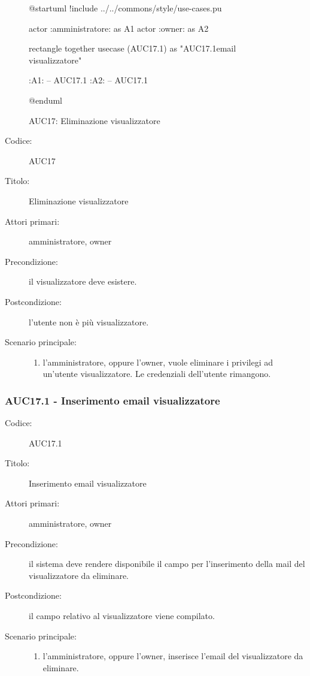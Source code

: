 \documentclass[../../../analisi-dei-requisiti.tex]{subfiles}
\begin{document}
\begin{figure}[h!]
  \centering
  \begin{plantuml}
  @startuml
  !include ../../commons/style/use-cases.pu

  actor :amministratore: as A1
  actor :owner: as A2

  rectangle {
    together {
      usecase (AUC17.1) as "AUC17.1\nInserimento email visualizzatore"
    }
  }

  :A1: -- AUC17.1
  :A2: -- AUC17.1

  @enduml
  \end{plantuml}
  \caption{AUC17: Eliminazione visualizzatore}
  \label{fig:auc17}
\end{figure}

\begin{description}
  \item[Codice:] AUC17
  \item[Titolo:] Eliminazione visualizzatore
  \item[Attori primari:] amministratore, owner
  \item[Precondizione:] il visualizzatore deve esistere.
  \item[Postcondizione:] l'utente non è più visualizzatore.
  \item[Scenario principale:]
  \begin{enumerate}
    \item l'amministratore, oppure l'owner, vuole eliminare i privilegi ad un'utente visualizzatore. Le credenziali dell'utente rimangono.
  \end{enumerate}
\end{description}

\subsubsection{AUC17.1 - Inserimento email visualizzatore}%
\label{subs:AUC17.1}
\begin{description}
  \item[Codice:] AUC17.1
  \item[Titolo:] Inserimento email visualizzatore
  \item[Attori primari:] amministratore, owner
  \item[Precondizione:] il sistema deve rendere disponibile il campo per l'inserimento della mail del visualizzatore da eliminare.
  \item[Postcondizione:] il campo relativo al visualizzatore viene compilato.
  \item[Scenario principale:]
  \begin{enumerate}
    \item l'amministratore, oppure l'owner, inserisce l'email del visualizzatore da eliminare.
  \end{enumerate}
\end{description}
\end{document}
